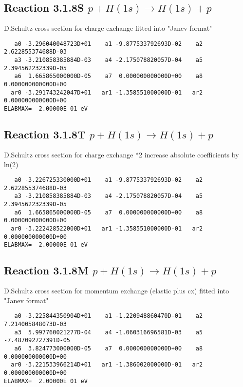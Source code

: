 \documentclass[12pt]{article}
\begin{document}
\subsection{
Reaction 3.1.8S $  p + H(1s) \rightarrow H(1s) + p  $
}

D.Schultz cross section for charge exchange
fitted into "Janev format"


\begin{small}\begin{verbatim}
   a0 -3.296040048723D+01    a1 -9.877533792693D-02    a2  2.622855374688D-03
   a3 -3.210858385884D-03    a4 -2.175078820057D-04    a5  2.394562232339D-05
   a6  1.665865000000D-05    a7  0.000000000000D+00    a8  0.000000000000D+00
  ar0 -3.291743242047D+01   ar1 -1.358551000000D-01   ar2  0.000000000000D+00
ELABMAX=  2.00000E 01 eV
\end{verbatim}\end{small}
\subsection{
Reaction 3.1.8T $  p + H(1s) \rightarrow H(1s) + p  $
}
D.Schultz cross section for charge exchange *2
increase absolute coefficients by ln(2)

\begin{small}\begin{verbatim}
   a0 -3.226725330000D+01    a1 -9.877533792693D-02    a2  2.622855374688D-03
   a3 -3.210858385884D-03    a4 -2.175078820057D-04    a5  2.394562232339D-05
   a6  1.665865000000D-05    a7  0.000000000000D+00    a8  0.000000000000D+00
  ar0 -3.222428522000D+01   ar1 -1.358551000000D-01   ar2  0.000000000000D+00
ELABMAX=  2.00000E 01 eV
\end{verbatim}\end{small}

\subsection{
Reaction 3.1.8M $  p + H(1s) \rightarrow H(1s) + p  $
}
D.Schultz cross section for momentum exchange (elastic plus cx)
fitted into "Janev format"

\begin{small}\begin{verbatim}
   a0 -3.225844350904D+01    a1 -1.220948860470D-01    a2  7.214005848073D-03
   a3  5.997760021277D-04    a4 -1.060316696581D-03    a5 -7.487092727391D-05
   a6  3.824773000000D-05    a7  0.000000000000D+00    a8  0.000000000000D+00
  ar0 -3.221533966214D+01   ar1 -1.386002000000D-01   ar2  0.000000000000D+00
ELABMAX=  2.00000E 01 eV
\end{verbatim}\end{small}
\end{document}
